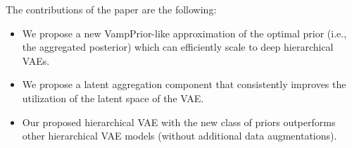 The contributions of the paper are the following:
\begin{itemize} %
    \item We propose a new VampPrior-like approximation of the optimal prior (i.e., the aggregated posterior) which can efficiently scale to deep hierarchical VAEs.
    \item We propose a latent aggregation component that consistently improves the utilization of the latent space of the VAE.
    \item Our proposed hierarchical VAE with the new class of priors outperforms other hierarchical VAE models (without additional data augmentations).
\end{itemize}
